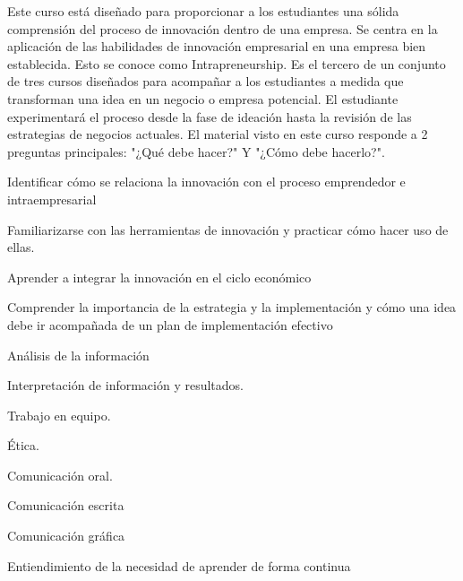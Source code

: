 \begin{syllabus}


\begin{justification}
Este curso está diseñado para proporcionar a los estudiantes una sólida comprensión del proceso de innovación dentro de una empresa. Se centra en la aplicación de las habilidades de innovación empresarial en una empresa bien establecida. Esto se conoce como Intrapreneurship.
Es el tercero de un conjunto de tres cursos diseñados para acompañar a los estudiantes a medida que transforman una idea en un negocio o empresa potencial. El estudiante experimentará el proceso desde la fase de ideación hasta la revisión de las estrategias de negocios actuales.
El material visto en este curso responde a 2 preguntas principales: "¿Qué debe hacer?" Y "¿Cómo debe hacerlo?". 

\end{justification}

\begin{goals}
\item Identificar cómo se relaciona la innovación con el proceso emprendedor e intraempresarial
\item Familiarizarse con las herramientas de innovación y practicar cómo hacer uso de ellas.
\item Aprender a integrar la innovación en el ciclo económico
\item Comprender la importancia de la estrategia y la implementación y cómo una idea debe ir acompañada de un plan de implementación efectivo
\item Análisis de la información
\item Interpretación de información y resultados.
\item Trabajo en equipo.
\item Ética.
\item Comunicación oral.
\item Comunicación escrita
\item Comunicación gráfica
\item Entiendimiento de la necesidad de aprender de forma continua
\end{goals}

\begin{outcomes}
    \item {} %
    \item {} %
    \item {} %
    \item {} %
    \item {} %
\end{outcomes}


\end{syllabus}

